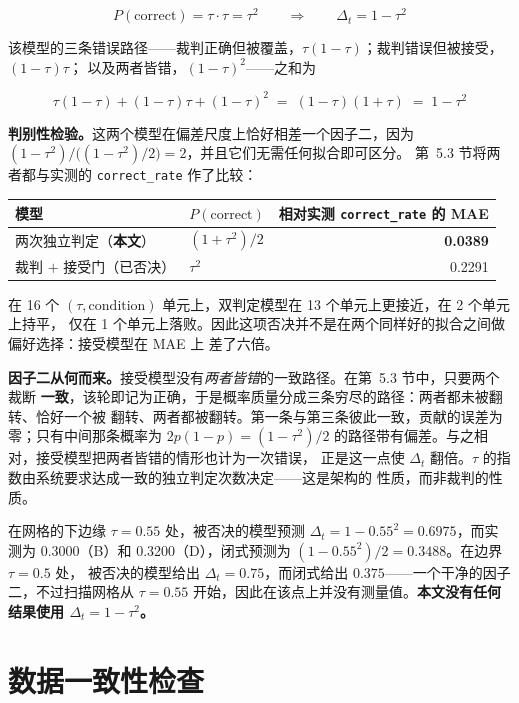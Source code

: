 \documentclass{article}
\begin{document}
\[
  P(\text{correct}) = \tau \cdot \tau = \tau^{2}
  \qquad\Longrightarrow\qquad
  \Delta_t = 1 - \tau^{2}
\]

该模型的三条错误路径——裁判正确但被覆盖，$\tau(1-\tau)$；裁判错误但被接受，$(1-\tau)\tau$；
以及两者皆错，$(1-\tau)^{2}$——之和为

\[
  \tau(1-\tau) + (1-\tau)\tau + (1-\tau)^{2} \;=\; (1-\tau)(1+\tau) \;=\; 1-\tau^{2}
\]

\textbf{判别性检验。}这两个模型在偏差尺度上恰好相差一个因子二，因为
$(1-\tau^{2}) \big/ \bigl((1-\tau^{2})/2\bigr) = 2$，并且它们无需任何拟合即可区分。
第~5.3 节将两者都与实测的 \texttt{correct\_rate} 作了比较：

\begin{center}
\small
\begin{tabular}{@{}llr@{}}
  \toprule
  模型 & $P(\text{correct})$ & 相对实测 \texttt{correct\_rate} 的 MAE \\
  \midrule
  两次独立判定（\textbf{本文}） & $(1 + \tau^{2})/2$ & \textbf{0.0389} \\
  裁判 $+$ 接受门（已否决） & $\tau^{2}$ & 0.2291 \\
  \bottomrule
\end{tabular}
\end{center}

在 16 个 $(\tau, \text{condition})$ 单元上，双判定模型在 13 个单元上更接近，在 2 个单元上持平，
仅在 1 个单元上落败。因此这项否决并不是在两个同样好的拟合之间做偏好选择：接受模型在 MAE 上
差了六倍。

\textbf{因子二从何而来。}接受模型没有\textit{两者皆错}的一致路径。在第~5.3 节中，只要两个裁断
\textbf{一致}，该轮即记为正确，于是概率质量分成三条穷尽的路径：两者都未被翻转、恰好一个被
翻转、两者都被翻转。第一条与第三条彼此一致，贡献的误差为零；只有中间那条概率为
$2p(1-p) = (1-\tau^{2})/2$ 的路径带有偏差。与之相对，接受模型把两者皆错的情形也计为一次错误，
正是这一点使 $\Delta_t$ 翻倍。$\tau$ 的指数由系统要求达成一致的独立判定次数决定——这是架构的
性质，而非裁判的性质。

在网格的下边缘 $\tau = 0.55$ 处，被否决的模型预测 $\Delta_t = 1 - 0.55^{2} = 0.6975$，而实测为
0.3000（B）和 0.3200（D），闭式预测为 $(1 - 0.55^{2})/2 = 0.3488$。在边界 $\tau = 0.5$ 处，
被否决的模型给出 $\Delta_t = 0.75$，而闭式给出 $0.375$——一个干净的因子二，不过扫描网格从
$\tau = 0.55$ 开始，因此在该点上并没有测量值。\textbf{本文没有任何结果使用
$\Delta_t = 1-\tau^{2}$。}

\section{数据一致性检查}
\label{app:data_consistency}
\end{document}
